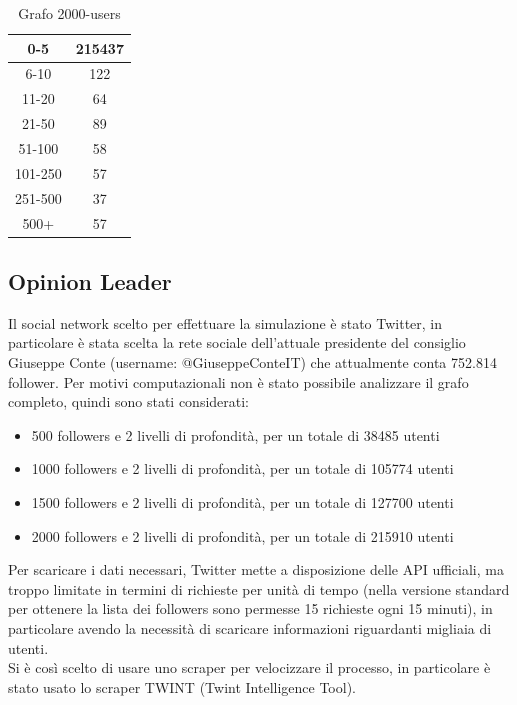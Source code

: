     \begin{table}[h!]
    \begin{tabular}{ |c|c| }
     \hline
     0-5 & 215437 \\
     \hline
     6-10 & 122 \\
     \hline
     11-20 & 64 \\
     \hline
     21-50 & 89 \\
     \hline
     51-100 & 58 \\
     \hline
     101-250 & 57 \\
     \hline
     251-500 & 37 \\
     \hline
     500+ & 57 \\
     \hline
    \end{tabular}
    \caption{Grafo 2000-users}
    \end{table}
    \subsection{Opinion Leader}
    Il social network scelto per effettuare la simulazione è stato Twitter, in particolare è stata scelta la rete sociale dell’attuale presidente del consiglio Giuseppe Conte (username: @GiuseppeConteIT\cite{twitterGiuseppeConte}) che attualmente conta 752.814 follower. Per motivi computazionali non è stato possibile analizzare il grafo completo, quindi sono stati considerati:
    \begin{itemize}
        \item 500 followers e 2 livelli di profondità, per un totale di 38485 utenti
        \item 1000 followers e 2 livelli di profondità, per un totale di 105774 utenti
        \item 1500 followers e 2 livelli di profondità, per un totale di 127700 utenti
        \item 2000 followers e 2 livelli di profondità, per un totale di 215910 utenti
    \end{itemize}
   
    Per scaricare i dati necessari, Twitter mette a disposizione delle API ufficiali, ma troppo limitate in termini di richieste per unità di tempo (nella versione standard per ottenere la lista dei followers sono permesse 15 richieste ogni 15 minuti), in particolare avendo la necessità di scaricare informazioni riguardanti migliaia di utenti.\\
    Si è così scelto di usare uno scraper per velocizzare il processo, in particolare è stato usato lo scraper TWINT\cite{Twint} (Twint Intelligence Tool).
